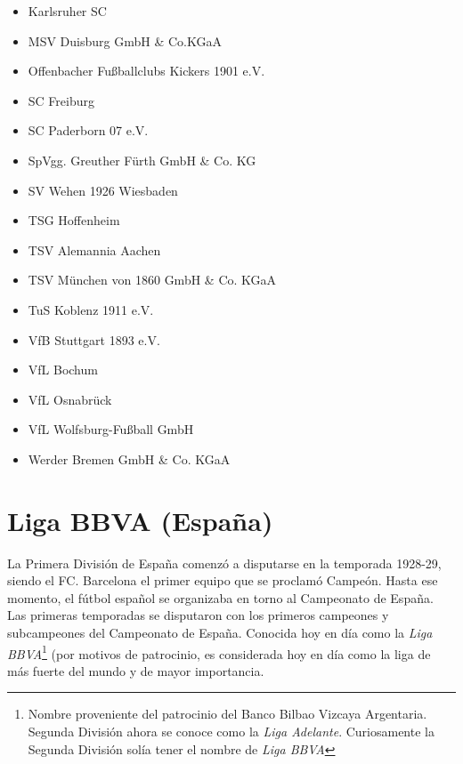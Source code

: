 \begin{multicols}{2}
\begin{itemize}
		\item Karlsruher SC

		\item MSV Duisburg GmbH \& Co.KGaA

		\item Offenbacher Fußballclubs Kickers 1901 e.V.

		\item SC Freiburg

		\item SC Paderborn 07 e.V.

		\item SpVgg. Greuther Fürth GmbH \& Co. KG

		\item SV Wehen 1926 Wiesbaden

		\item TSG Hoffenheim

		\item TSV Alemannia Aachen

		\item TSV München von 1860 GmbH \& Co. KGaA

		\item TuS Koblenz 1911 e.V.

		\item VfB Stuttgart 1893 e.V.

		\item VfL Bochum

		\item VfL Osnabrück

		\item VfL Wolfsburg-Fußball GmbH

		\item Werder Bremen GmbH \& Co. KGaA

	\end{itemize}
\end{multicols}


\section{Liga BBVA (España)}

La Primera División de España comenzó a disputarse en la temporada 1928-29, siendo el FC. Barcelona el primer equipo que se proclamó Campeón. Hasta ese momento, el fútbol español se organizaba en torno al Campeonato de España. Las primeras temporadas se disputaron con los primeros campeones y subcampeones del Campeonato de España. Conocida hoy en día como la \emph{Liga BBVA}\footnote{Nombre proveniente del patrocinio del Banco Bilbao Vizcaya Argentaria. Segunda División ahora se conoce como la \emph{Liga Adelante}. Curiosamente la Segunda División solía tener el nombre de \emph{Liga BBVA} } (por motivos de patrocinio, es considerada hoy en día como la liga de más fuerte del mundo y de mayor importancia. \cite{strongest-league}

